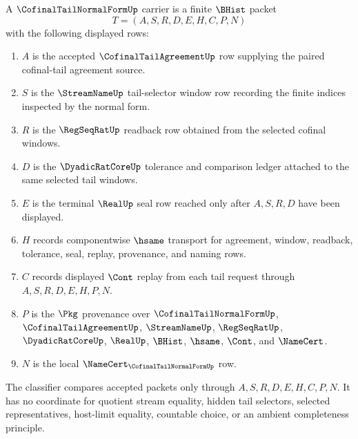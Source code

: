 \begin{definition}
\label{def:cofinal-tail-normal-form-carrier}
A $\CofinalTailNormalFormUp$ carrier is a finite $\BHist$ packet
$$
T=(A,S,R,D,E,H,C,P,N)
$$
with the following displayed rows:
\begin{enumerate}
\item $A$ is the accepted $\CofinalTailAgreementUp$ row supplying the paired cofinal-tail agreement source.
\item $S$ is the $\StreamNameUp$ tail-selector window row recording the finite indices inspected by the normal form.
\item $R$ is the $\RegSeqRatUp$ readback row obtained from the selected cofinal windows.
\item $D$ is the $\DyadicRatCoreUp$ tolerance and comparison ledger attached to the same selected tail windows.
\item $E$ is the terminal $\RealUp$ seal row reached only after $A,S,R,D$ have been displayed.
\item $H$ records componentwise $\hsame$ transport for agreement, window, readback, tolerance, seal, replay, provenance, and naming rows.
\item $C$ records displayed $\Cont$ replay from each tail request through $A,S,R,D,E,H,P,N$.
\item $P$ is the $\Pkg$ provenance over $\CofinalTailNormalFormUp$, $\CofinalTailAgreementUp$, $\StreamNameUp$, $\RegSeqRatUp$, $\DyadicRatCoreUp$, $\RealUp$, $\BHist$, $\hsame$, $\Cont$, and $\NameCert$.
\item $N$ is the local $\NameCert_{\CofinalTailNormalFormUp}$ row.
\end{enumerate}
The classifier compares accepted packets only through $A,S,R,D,E,H,C,P,N$. It has no coordinate for quotient stream equality, hidden tail selectors, selected representatives, host-limit equality, countable choice, or an ambient completeness principle.
\end{definition}

